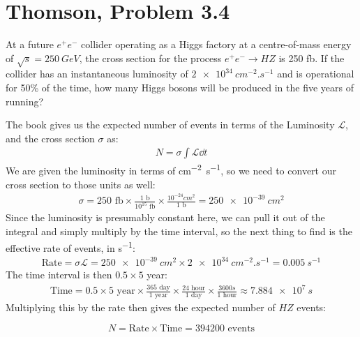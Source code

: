 \documentclass[12pt]{article}
\renewcommand{\L}{\mathcal{L}}
\begin{document}
\section{Thomson, Problem 3.4}
\begin{problem}
  At a future $e^+e^-$ collider operating as a Higgs factory at a centre-of-mass energy of $\sqrt{s}=\SI{250}{GeV}$, the cross section for the process $e^+e^-\to HZ$  is 250 fb. If the collider has an instantaneous luminosity of $\SI{2e34}{cm^{-2}.s^{-1}}$ and is operational for 50\% of the time, how many Higgs bosons will be produced in the five years of running?
\end{problem}
The book gives us the expected number of events in terms of the Luminosity $\L$, and the cross section $\sigma$ as:
\begin{align*}
  N=\sigma\int\L\dd{t}
\end{align*}
We are given the luminosity in terms of \unit{cm^{-2}.s^{-1}}, so we need to convert our cross section to those units as well:
\begin{align*}
  \sigma=250\text{ fb}
  \times\frac{1\text{ b}}{10^{15}\text{ fb}}
  \times\frac{10^{-24}\unit{cm^{2}}}{1\text{ b}}=\SI{250e-39}{cm^2}
\end{align*}
Since the luminosity is presumably constant here, we can pull it out of the integral and simply multiply by the time interval, so the next thing to find is the effective rate of events, in \unit{s^{-1}}:
\begin{align*}
  \mathrm{Rate}=\sigma\L=\SI{250e-39}{cm^2}\times\SI{2e34}{cm^{-2}.s^{-1}}
  =\SI{0.005}{s^{-1}}
\end{align*}
The time interval is then $0.5\times5$ year:
\begin{align*}
  \mathrm{Time}=0.5\times5\text{ year}
  \times\frac{365\text{ day}}{1\text{ year}}
  \times\frac{24\text{ hour}}{1\text{ day}}
  \times\frac{3600\unit{s}}{1\text{ hour}}
  \approx\SI{7.884e7}{s}
\end{align*}
Multiplying this by the rate then gives the expected number of $HZ$ events:

\begin{equation}
  \label{eq:p2}
  \boxed{N=\mathrm{Rate}\times\mathrm{Time}=394200\text{ events}}
\end{equation}
\end{document}
